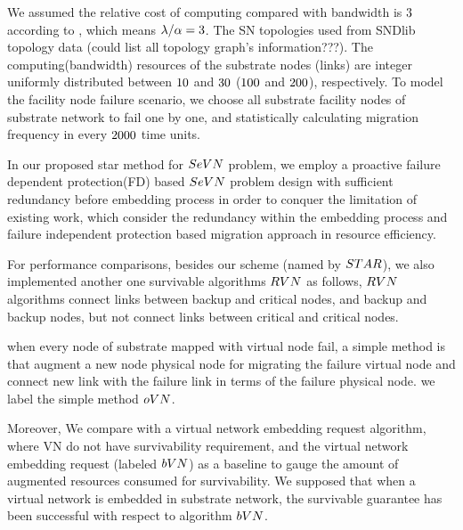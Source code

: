We assumed the relative cost of computing compared with bandwidth is $3$ according to  \cite{armbrust2009above,yu2010survivable}, which means $\lambda/\alpha=3$.
The SN topologies used from SNDlib topology data \cite{orlowski2010sndlib}(could list all topology graph's information???).
The computing(bandwidth) resources of the substrate nodes (links) are integer uniformly distributed between $10$ and $30$ ($100$ and $200$), respectively. To model the facility node failure scenario, we choose all substrate facility nodes of substrate network to fail one by one, and statistically calculating migration frequency in every $2000$ time units.


In our proposed star method for $SeVN$ problem, we employ a proactive failure dependent protection(FD) based $SeVN$ problem design with sufficient redundancy before embedding process in order to conquer the limitation of existing work, which consider the redundancy within the embedding process and failure independent protection based migration approach in resource efficiency.

For performance comparisons, besides our scheme (named by $STAR$), we also implemented another one survivable algorithms $RVN$ \cite{yeow2011designing} as follows, $RVN$ algorithms connect links between backup and critical nodes, and backup and backup nodes, but not connect links between critical and critical nodes.

when every node of substrate mapped with virtual node fail, a simple method is that augment a new node physical node for migrating the failure virtual node and connect new link with the failure link in terms of the failure physical node. we label the simple method $oVN$.

Moreover, We compare with a virtual network embedding request algorithm, where VN do not have survivability requirement, and the virtual network embedding request (labeled $bVN$) as a baseline to gauge the amount of augmented resources consumed for survivability. We supposed that when a virtual network is embedded in substrate network, the survivable guarantee has been successful with respect to algorithm $bVN$.



